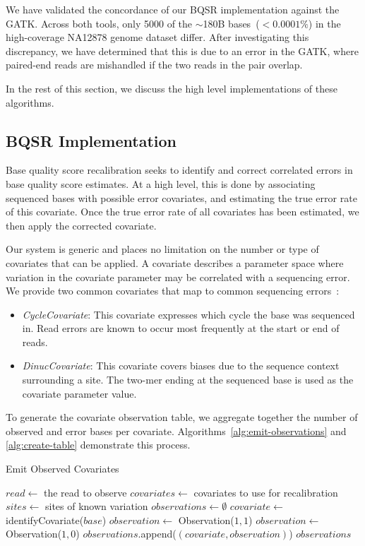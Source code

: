 \documentclass[masters]{ucbthesis}
\begin{document}
\begin{enumerate}
We have validated the concordance of our BQSR implementation against the GATK. Across both tools, only 5000
of the $\sim$180B bases~($<0.0001\%$) in the high-coverage NA12878 genome dataset differ. After investigating
this discrepancy, we have determined that this is due to an error in the GATK, where paired-end reads are
mishandled if the two reads in the pair overlap.
\end{enumerate}

In the rest of this section, we discuss the high level implementations of these algorithms.

\subsection{BQSR Implementation}
\label{sec:bqsr-implementation}

Base quality score recalibration seeks to identify and correct correlated errors in base quality score estimates.
At a high level, this is done by associating sequenced bases with possible error covariates, and estimating the
true error rate of this covariate. Once the true error rate of all covariates has been estimated, we then apply
the corrected covariate.

Our system is generic and places no limitation on the number or type of covariates that can be applied. A covariate
describes a parameter space where variation in the covariate parameter may be correlated with a sequencing
error. We provide two common covariates that map to common sequencing errors~\cite{nakamura11}:

\begin{itemize}
\item \emph{CycleCovariate}: This covariate expresses which cycle the base was sequenced in. Read errors are
known to occur most frequently at the start or end of reads.
\item \emph{DinucCovariate}: This covariate covers biases due to the sequence context surrounding a site. The two-mer
ending at the sequenced base is used as the covariate parameter value.
\end{itemize}

To generate the covariate observation table, we aggregate together the number of observed and error bases per
covariate. Algorithms~\ref{alg:emit-observations} and \ref{alg:create-table} demonstrate this process.

\begin{algorithm}
\caption{Emit Observed Covariates}
\label{alg:emit-observations}
\begin{algorithmic}
\STATE $read \leftarrow$ the read to observe
\STATE $covariates \leftarrow$ covariates to use for recalibration
\STATE $sites \leftarrow$ sites of known variation
\STATE $observations \leftarrow \emptyset$
\STATE $covariate \leftarrow$ identifyCovariate($base$)
\STATE $observation \leftarrow$ Observation($1, 1$)
\ELSE
\STATE $observation \leftarrow$ Observation($1, 0$)
\ENDIF
\STATE $observations$.append($(covariate, observation)$)
\ENDFOR
\RETURN $observations$
\end{algorithmic}
\end{algorithm}
\end{document}
